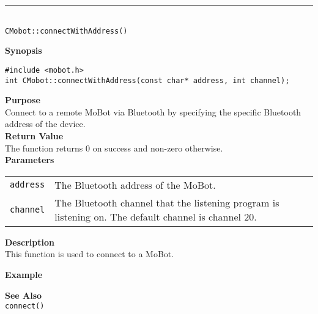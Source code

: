 \noindent
\vspace{5pt}
\rule{4.5in}{0.015in} \\
\noindent
{\LARGE \texttt{CMobot::connectWithAddress()}}\\
{}

\noindent
{\bf Synopsis}\\
\begin{verbatim}
#include <mobot.h>
int CMobot::connectWithAddress(const char* address, int channel);
\end{verbatim}

\noindent
{\bf Purpose}\\
Connect to a remote MoBot via Bluetooth by specifying the specific Bluetooth
address of the device.\\

\noindent
{\bf Return Value}\\
The function returns 0 on success and non-zero otherwise.\\

\noindent
{\bf Parameters}
\vspace{-0.1in}
\begin{description}
\item               
\begin{tabular}{p{10 mm}p{145 mm}}
\texttt{address} & The Bluetooth address of the MoBot. \\
\texttt{channel} & The Bluetooth channel that the listening program is
listening on. The default channel is channel 20. \\
\end{tabular}
\end{description}

\noindent
{\bf Description}\\
This function is used to connect to a MoBot. 

\noindent
{\bf Example}\\
\noindent

\noindent
{\bf See Also}\\
\texttt{connect()}


